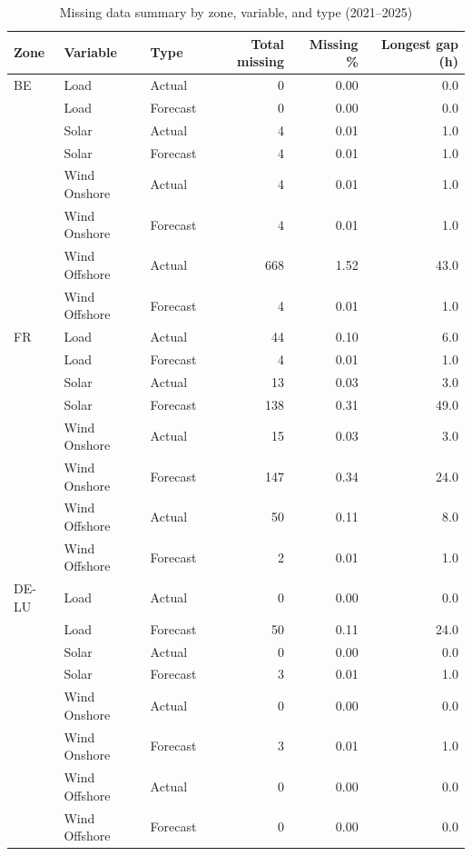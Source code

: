 \begin{table}[htbp]
\centering
\caption{Missing data summary by zone, variable, and type (2021--2025)}
\label{tab:missing-data-summary-2021-2025}
\begin{tabular}{lllrrr}
\toprule
Zone & Variable & Type & Total missing & Missing \% & Longest gap (h) \\
\midrule
BE & Load & Actual & 0 & 0.00 & 0.0 \\
 & Load & Forecast & 0 & 0.00 & 0.0 \\
 & Solar & Actual & 4 & 0.01 & 1.0 \\
 & Solar & Forecast & 4 & 0.01 & 1.0 \\
 & Wind Onshore & Actual & 4 & 0.01 & 1.0 \\
 & Wind Onshore & Forecast & 4 & 0.01 & 1.0 \\
 & Wind Offshore & Actual & 668 & 1.52 & 43.0 \\
 & Wind Offshore & Forecast & 4 & 0.01 & 1.0 \\
\midrule
FR & Load & Actual & 44 & 0.10 & 6.0 \\
 & Load & Forecast & 4 & 0.01 & 1.0 \\
 & Solar & Actual & 13 & 0.03 & 3.0 \\
 & Solar & Forecast & 138 & 0.31 & 49.0 \\
 & Wind Onshore & Actual & 15 & 0.03 & 3.0 \\
 & Wind Onshore & Forecast & 147 & 0.34 & 24.0 \\
 & Wind Offshore & Actual & 50 & 0.11 & 8.0 \\
 & Wind Offshore & Forecast & 2 & 0.01 & 1.0 \\
\midrule
DE-LU & Load & Actual & 0 & 0.00 & 0.0 \\
 & Load & Forecast & 50 & 0.11 & 24.0 \\
 & Solar & Actual & 0 & 0.00 & 0.0 \\
 & Solar & Forecast & 3 & 0.01 & 1.0 \\
 & Wind Onshore & Actual & 0 & 0.00 & 0.0 \\
 & Wind Onshore & Forecast & 3 & 0.01 & 1.0 \\
 & Wind Offshore & Actual & 0 & 0.00 & 0.0 \\
 & Wind Offshore & Forecast & 0 & 0.00 & 0.0 \\
\bottomrule
\end{tabular}
\end{table}
